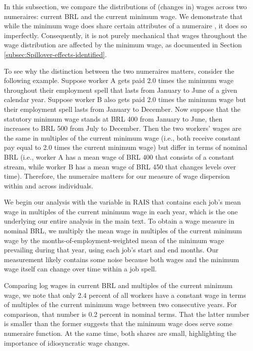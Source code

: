 In this subsection, we compare the distributions of (changes in) wages across two numeraires: current BRL and the current minimum wage. We demonstrate that while the minimum wage does share certain attributes of a numeraire , it does so imperfectly. Consequently, it is not purely mechanical that wages throughout the wage distribution are affected by the minimum wage, as documented in Section \ref{subsec:Spillover-effects-identified}.

To see why the distinction between the two numeraires matters, consider the following example. Suppose worker A gets paid 2.0 times the minimum wage throughout their employment spell that lasts from January to June of a given calendar year. Suppose worker B also gets paid 2.0 times the minimum wage but their employment spell lasts from January to December. Now suppose that the statutory minimum wage stands at BRL 400 from January to June, then increases to BRL 500 from July to December. Then the two workers' wages are the same in multiples of the current minimum wage (i.e., both receive constant pay equal to 2.0 times the current minimum wage) but differ in terms of nominal BRL (i.e., worker A has a mean wage of BRL 400 that consists of a constant stream, while worker B has a mean wage of BRL 450 that changes levels over time). Therefore, the numeraire matters for our measure of wage dispersion within and across individuals.

We begin our analysis with the variable in RAIS that contains each job's mean wage in multiples of the current minimum wage in each year, which is the one underlying our entire analysis in the main text. To obtain a wage measure in nominal BRL, we multiply the mean wage in multiples of the current minimum wage by the months-of-employment-weighted mean of the minimum wage prevailing during that year, using each job's start and end months. Our measurement likely contains some noise because both wages and the minimum wage itself can change over time within a job spell.

Comparing log wages in current BRL and multiples of the current minimum wage, we note that only 2.4 percent of all workers have a constant wage in terms of multiples of the current minimum wage between two consecutive years. For comparison, that number is 0.2 percent in nominal terms. That the latter number is smaller than the former suggests that the minimum wage does serve some numeraire function. At the same time, both shares are small, highlighting the importance of idiosyncratic wage changes.

